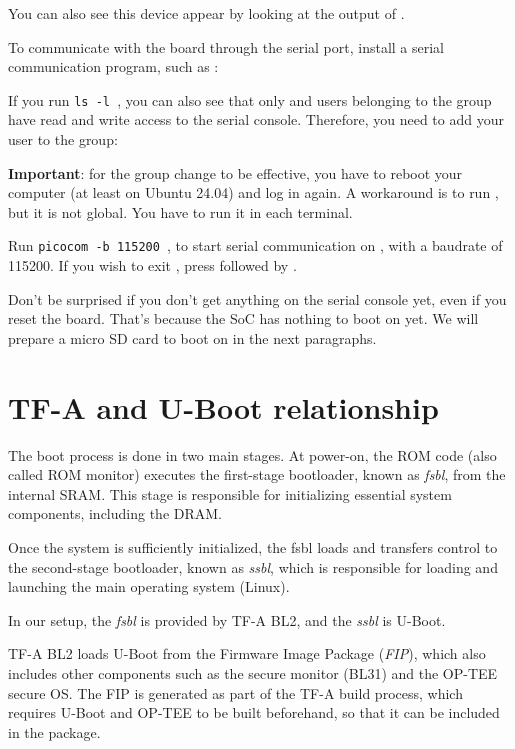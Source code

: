 You can also see this device appear by looking at the output of
.

To communicate with the board through the serial port, install a
serial communication program, such as :


If you run {\tt ls -l \hosttty}, you can also see that only
 and users belonging to the  group have
read and write access to the serial console. Therefore, you need
to add your user to the  group:


{\bf Important}: for the group change to be effective, you have to
reboot your computer (at least on Ubuntu 24.04) and log in again.
A workaround is to run , but it is not global.
You have to run it in each terminal.

Run {\tt picocom -b 115200 \hosttty}, to start serial
communication on {\tt \hosttty}, with a baudrate of 115200.
If you wish to exit , press \code{[Ctrl][a]} followed by
\code{[Ctrl][x]}.

Don't be surprised if you don't get anything on the serial console yet,
even if you reset the board. That's because the SoC has nothing to boot
on yet. We will prepare a micro SD card to boot on in the next paragraphs.

\section{TF-A and U-Boot relationship}

The boot process is done in two main stages. At power-on, the ROM code
 (also called ROM monitor) executes the first-stage bootloader, known as
  {\em fsbl}, from the internal SRAM. This stage is responsible 
  for initializing essential system components, including the DRAM.

Once the system is sufficiently initialized, the fsbl loads and transfers
 control to the second-stage bootloader, known as {\em ssbl},
 which is responsible for loading and launching the main operating system (Linux).

In our setup, the {\em fsbl} is provided by TF-A BL2, and the {\em ssbl} is U-Boot.

TF-A BL2 loads U-Boot from the Firmware Image Package ({\em FIP}),
which also includes other components such as the secure monitor (BL31) 
and the OP-TEE secure OS. The FIP is generated as part of the TF-A build process,
which requires U-Boot and OP-TEE to be built beforehand, so that it can be included in the package.

